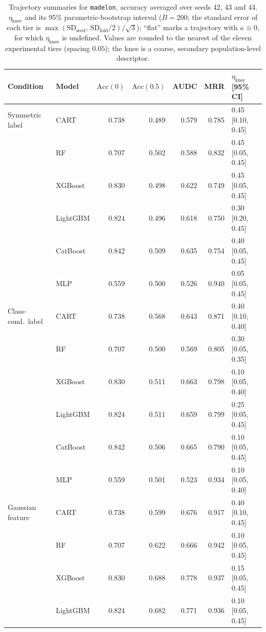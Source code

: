 \documentclass[pdflatex,sn-mathphys]{sn-jnl}
\theoremstyle{thmstyleone}
\begin{document}
\begin{table}[htbp]
\centering
\scriptsize
\setlength{\tabcolsep}{3.5pt}
\caption{Trajectory summaries for \texttt{madelon}, accuracy averaged over seeds 42, 43 and 44. $\eta_{\mathrm{knee}}$ and its 95\% parametric-bootstrap interval ($B=200$; the standard error of each tier is $\max(\mathrm{SD}_{\mathrm{seed}},\,\mathrm{SD}_{\mathrm{fold}}/2)/\sqrt3$); ``flat'' marks a trajectory with $\kappa\equiv 0$, for which $\eta_{\mathrm{knee}}$ is undefined. Values are rounded to the nearest of the eleven experimental tiers (spacing $0.05$); the knee is a coarse, secondary population-level descriptor.}
\label{tab:traj_madelon}
\begin{tabular}{@{}llrrrrl@{}}
\toprule
Condition & Model & $\mathrm{Acc}(0)$ & $\mathrm{Acc}(0.5)$ & AUDC & MRR & $\eta_{\mathrm{knee}}$ [95\% CI] \\
\midrule
Symmetric label & CART & 0.738 & 0.489 & 0.579 & 0.785 & 0.45 [0.10, 0.45] \\
 & RF & 0.707 & 0.502 & 0.588 & 0.832 & 0.45 [0.05, 0.45] \\
 & XGBoost & 0.830 & 0.498 & 0.622 & 0.749 & 0.45 [0.05, 0.45] \\
 & LightGBM & 0.824 & 0.496 & 0.618 & 0.750 & 0.30 [0.20, 0.45] \\
 & CatBoost & 0.842 & 0.509 & 0.635 & 0.754 & 0.40 [0.05, 0.45] \\
 & MLP & 0.559 & 0.500 & 0.526 & 0.940 & 0.05 [0.05, 0.45] \\
\midrule
Class-cond.\ label & CART & 0.738 & 0.568 & 0.643 & 0.871 & 0.40 [0.10, 0.40] \\
 & RF & 0.707 & 0.500 & 0.569 & 0.805 & 0.30 [0.05, 0.35] \\
 & XGBoost & 0.830 & 0.511 & 0.663 & 0.798 & 0.10 [0.05, 0.40] \\
 & LightGBM & 0.824 & 0.511 & 0.659 & 0.799 & 0.25 [0.05, 0.45] \\
 & CatBoost & 0.842 & 0.506 & 0.665 & 0.790 & 0.10 [0.05, 0.45] \\
 & MLP & 0.559 & 0.501 & 0.523 & 0.934 & 0.10 [0.05, 0.40] \\
\midrule
Gaussian feature & CART & 0.738 & 0.599 & 0.676 & 0.917 & 0.40 [0.10, 0.45] \\
 & RF & 0.707 & 0.622 & 0.666 & 0.942 & 0.10 [0.05, 0.45] \\
 & XGBoost & 0.830 & 0.688 & 0.778 & 0.937 & 0.15 [0.05, 0.45] \\
 & LightGBM & 0.824 & 0.682 & 0.771 & 0.936 & 0.10 [0.05, 0.45] \\

\end{tabular}
\end{table}
\end{document}
